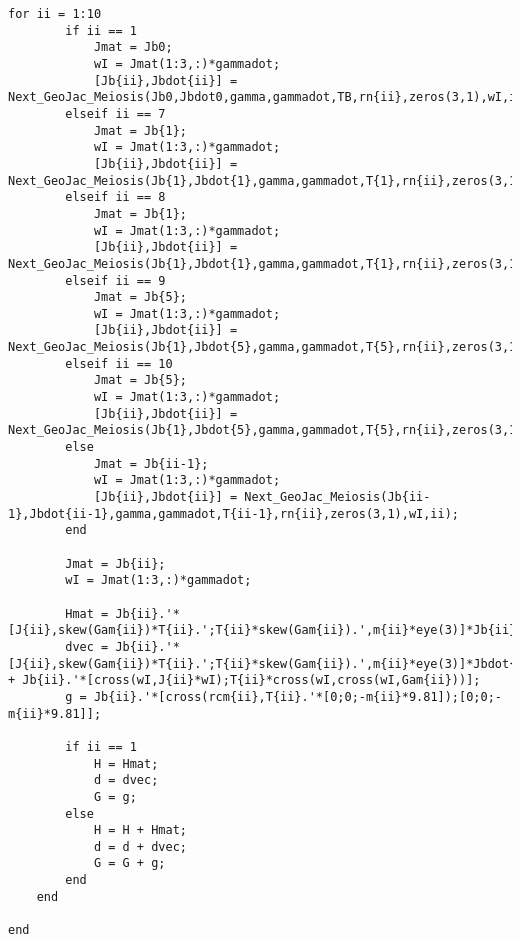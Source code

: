 \begin{lstlisting}[frame=lines,style=Matlab-editor,basicstyle = \mlttfamily, caption={H, D, and G Calculations}]
    for ii = 1:10
        if ii == 1
            Jmat = Jb0;
            wI = Jmat(1:3,:)*gammadot;
            [Jb{ii},Jbdot{ii}] = Next_GeoJac_Meiosis(Jb0,Jbdot0,gamma,gammadot,TB,rn{ii},zeros(3,1),wI,ii);
        elseif ii == 7
            Jmat = Jb{1};
            wI = Jmat(1:3,:)*gammadot;
            [Jb{ii},Jbdot{ii}] = Next_GeoJac_Meiosis(Jb{1},Jbdot{1},gamma,gammadot,T{1},rn{ii},zeros(3,1),wI,ii);
        elseif ii == 8
            Jmat = Jb{1};
            wI = Jmat(1:3,:)*gammadot;
            [Jb{ii},Jbdot{ii}] = Next_GeoJac_Meiosis(Jb{1},Jbdot{1},gamma,gammadot,T{1},rn{ii},zeros(3,1),wI,ii);
        elseif ii == 9
            Jmat = Jb{5};
            wI = Jmat(1:3,:)*gammadot;
            [Jb{ii},Jbdot{ii}] = Next_GeoJac_Meiosis(Jb{1},Jbdot{5},gamma,gammadot,T{5},rn{ii},zeros(3,1),wI,ii);
        elseif ii == 10
            Jmat = Jb{5};
            wI = Jmat(1:3,:)*gammadot;
            [Jb{ii},Jbdot{ii}] = Next_GeoJac_Meiosis(Jb{1},Jbdot{5},gamma,gammadot,T{5},rn{ii},zeros(3,1),wI,ii);
        else
            Jmat = Jb{ii-1};
            wI = Jmat(1:3,:)*gammadot;
            [Jb{ii},Jbdot{ii}] = Next_GeoJac_Meiosis(Jb{ii-1},Jbdot{ii-1},gamma,gammadot,T{ii-1},rn{ii},zeros(3,1),wI,ii);
        end

        Jmat = Jb{ii};
        wI = Jmat(1:3,:)*gammadot;

        Hmat = Jb{ii}.'*[J{ii},skew(Gam{ii})*T{ii}.';T{ii}*skew(Gam{ii}).',m{ii}*eye(3)]*Jb{ii};
        dvec = Jb{ii}.'*[J{ii},skew(Gam{ii})*T{ii}.';T{ii}*skew(Gam{ii}).',m{ii}*eye(3)]*Jbdot{ii}*gammadot + Jb{ii}.'*[cross(wI,J{ii}*wI);T{ii}*cross(wI,cross(wI,Gam{ii}))];
        g = Jb{ii}.'*[cross(rcm{ii},T{ii}.'*[0;0;-m{ii}*9.81]);[0;0;-m{ii}*9.81]];

        if ii == 1
            H = Hmat;
            d = dvec;
            G = g;
        else
            H = H + Hmat;
            d = d + dvec;
            G = G + g;
        end
    end

end
\end{lstlisting}
